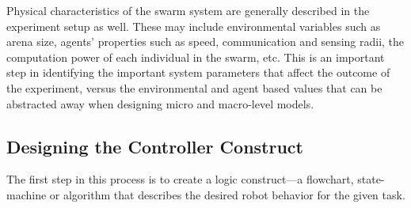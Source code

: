 \documentclass[Main.tex]{subfiles}
\begin{document}
Physical characteristics of the swarm system are generally described in the experiment setup as well. These may include environmental variables such as arena size, agents' properties such as speed, communication and sensing radii, the computation power of each individual in the swarm, etc. This is an important step in identifying the important system parameters that affect the outcome of the experiment, versus the environmental and agent based values that can be abstracted away when designing micro and macro-level models.
 

\subsection{Designing the Controller Construct}
The first step in this process is to create a logic construct---a flowchart, state-machine or algorithm that describes the desired robot behavior for the given task.

%

\end{document}
